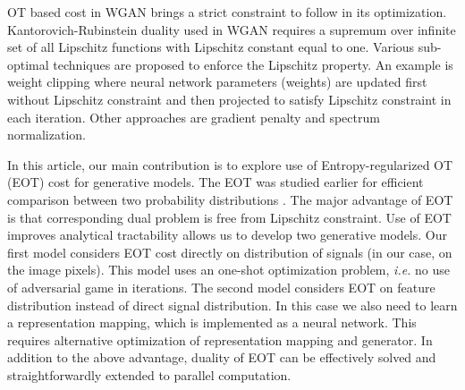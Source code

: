 OT based cost in WGAN brings a strict constraint to follow in its optimization.
Kantorovich-Rubinstein duality used in WGAN requires a supremum over
infinite set of all Lipschitz functions with Lipschitz constant equal
to one. Various sub-optimal techniques are proposed to enforce the
Lipschitz property. An example is weight clipping
\cite{2017arXiv170107875A} where neural network parameters (weights)
are updated first without Lipschitz constraint and then projected to
satisfy Lipschitz constraint in each iteration. Other approaches are
gradient penalty\cite{2017arXiv170400028G} and spectrum normalization\cite{2018arXiv180205957M}.

In this article, our main contribution is to explore use of Entropy-regularized OT (EOT) cost for generative models. 
The EOT was studied earlier for efficient comparison between two probability distributions \cite{2013arXiv1306.0895C}. 
The major advantage of EOT is
that corresponding dual problem is free from Lipschitz constraint. Use of EOT improves
analytical tractability allows us to develop two generative models. Our
first model considers EOT cost directly on distribution of signals (in our case,
on the image pixels). This model uses an one-shot optimization problem, \emph{i.e.} no use of adversarial game in iterations. The second model
considers EOT on feature distribution instead of direct signal
distribution. In this case we also need to learn a representation
mapping, which is implemented as a neural network. 
This requires alternative optimization of representation mapping and
generator. In addition to the above advantage, duality of EOT can be
effectively solved and straightforwardly extended to parallel computation. 





